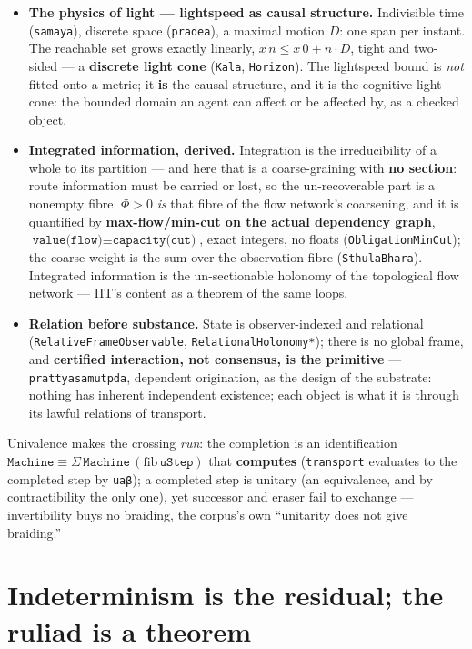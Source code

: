 \documentclass[11pt]{article}
\newcommand{\tm}[1]{\texttt{#1}}
\begin{document}
\begin{itemize}
  \item \textbf{The physics of light --- lightspeed as causal structure.}
  Indivisible time (\tm{samaya}), discrete space (\tm{pradea}), a maximal
  motion $D$: one span per instant. The reachable set grows exactly linearly,
  $x\,n \le x\,0 + n\cdot D$, tight and two-sided --- a \textbf{discrete light
  cone} (\tm{Kala}, \tm{Horizon}). The lightspeed bound is \emph{not} fitted
  onto a metric; it \textbf{is} the causal structure, and it is the cognitive
  light cone: the bounded domain an agent can affect or be affected by, as a
  checked object.

  \item \textbf{Integrated information, derived.} Integration is the
  irreducibility of a whole to its partition --- and here that is a
  coarse-graining with \textbf{no section}: route information must be carried or
  lost, so the un-recoverable part is a nonempty fibre. $\Phi > 0$ \emph{is}
  that fibre of the flow network's coarsening, and it is quantified by
  \textbf{max-flow/min-cut on the actual dependency graph},
  $\tm{value(flow)} \equiv \tm{capacity(cut)}$, exact integers, no floats
  (\tm{ObligationMinCut}); the coarse weight is the sum over the observation
  fibre (\tm{SthulaBhara}). Integrated information is the un-sectionable
  holonomy of the topological flow network --- IIT's content as a theorem of the
  same loops.

  \item \textbf{Relation before substance.} State is observer-indexed and
  relational (\tm{RelativeFrameObservable}, \tm{RelationalHolonomy*}); there is
  no global frame, and \textbf{certified interaction, not consensus, is the
  primitive} --- \tm{prattyasamutpda}, dependent origination, as the design of
  the substrate: nothing has inherent independent existence; each object is what
  it is through its lawful relations of transport.
\end{itemize}

Univalence makes the crossing \emph{run}: the completion is an identification
$\tm{Machine} \equiv \Sigma\,\tm{Machine}\,(\mathrm{fib}\,\tm{uStep})$ that
\textbf{computes} (\tm{transport} evaluates to the completed step by
\tm{uaβ}); a completed step is unitary (an equivalence, and by contractibility
the only one), yet successor and eraser fail to exchange --- invertibility buys
no braiding, the corpus's own ``unitarity does not give braiding.''

\section{Indeterminism is the residual; the ruliad is a theorem}
\end{document}
